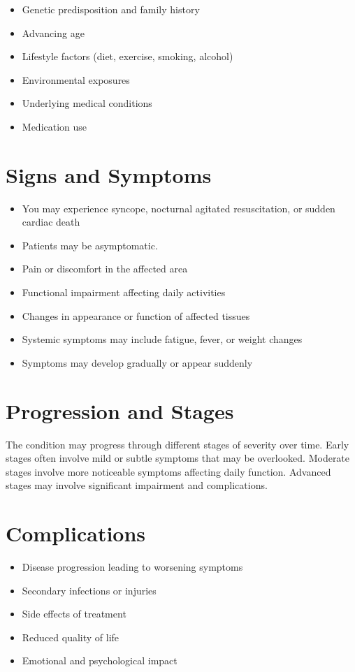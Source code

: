 \begin{itemize}[noitemsep]
  \item Genetic predisposition and family history
  \item Advancing age
  \item Lifestyle factors (diet, exercise, smoking, alcohol)
  \item Environmental exposures
  \item Underlying medical conditions
  \item Medication use
\end{itemize}
\section{Signs and Symptoms}
\begin{itemize}[noitemsep]
  \item You may experience syncope, nocturnal agitated resuscitation, or sudden cardiac death
  \item Patients may be asymptomatic.
  \item Pain or discomfort in the affected area
  \item Functional impairment affecting daily activities
  \item Changes in appearance or function of affected tissues
  \item Systemic symptoms may include fatigue, fever, or weight changes
  \item Symptoms may develop gradually or appear suddenly
\end{itemize}
\section{Progression and Stages}
The condition may progress through different stages of severity over time. Early stages often involve mild or subtle symptoms that may be overlooked. Moderate stages involve more noticeable symptoms affecting daily function. Advanced stages may involve significant impairment and complications.
\section{Complications}
\begin{itemize}[noitemsep]
  \item Disease progression leading to worsening symptoms
  \item Secondary infections or injuries
  \item Side effects of treatment
  \item Reduced quality of life
  \item Emotional and psychological impact
\end{itemize}
